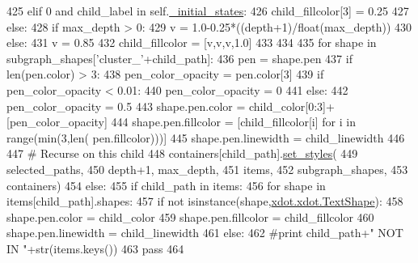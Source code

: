 \begin{DoxyCode}
425                         \textcolor{keywordflow}{elif} 0 \textcolor{keywordflow}{and} child\_label \textcolor{keywordflow}{in} self.\hyperlink{classsmacc__viewer_1_1ContainerNode_a3d5c9521ab4377e7b94e437d4f7e5a83}{\_initial\_states}:
426                             child\_fillcolor[3] = 0.25
427                         \textcolor{keywordflow}{else}:
428                             \textcolor{keywordflow}{if} max\_depth > 0:
429                                 v = 1.0-0.25*((depth+1)/float(max\_depth))
430                             \textcolor{keywordflow}{else}:
431                                 v = 0.85
432                             child\_fillcolor = [v,v,v,1.0]
433 
434                         
435                         \textcolor{keywordflow}{for} shape \textcolor{keywordflow}{in} subgraph\_shapes[\textcolor{stringliteral}{'cluster\_'}+child\_path]:
436                             pen = shape.pen
437                             \textcolor{keywordflow}{if} len(pen.color) > 3:
438                                 pen\_color\_opacity = pen.color[3]
439                                 \textcolor{keywordflow}{if} pen\_color\_opacity < 0.01:
440                                     pen\_color\_opacity = 0
441                             \textcolor{keywordflow}{else}:
442                                 pen\_color\_opacity = 0.5
443                             shape.pen.color = child\_color[0:3]+[pen\_color\_opacity]
444                             shape.pen.fillcolor = [child\_fillcolor[i] \textcolor{keywordflow}{for} i \textcolor{keywordflow}{in} range(min(3,len(
      pen.fillcolor)))]
445                             shape.pen.linewidth = child\_linewidth
446 
447                         \textcolor{comment}{# Recurse on this child}
448                         containers[child\_path].\hyperlink{classsmacc__viewer_1_1ContainerNode_ae35633b977b8ea568e70a62dcd3c4632}{set\_styles}(
449                                 selected\_paths,
450                                 depth+1, max\_depth,
451                                 items,
452                                 subgraph\_shapes,
453                                 containers)
454                 \textcolor{keywordflow}{else}:
455                     \textcolor{keywordflow}{if} child\_path \textcolor{keywordflow}{in} items:
456                         \textcolor{keywordflow}{for} shape \textcolor{keywordflow}{in} items[child\_path].shapes:
457                             \textcolor{keywordflow}{if} \textcolor{keywordflow}{not} isinstance(shape,\hyperlink{classsmacc__viewer_1_1xdot_1_1xdot_1_1TextShape}{xdot.xdot.TextShape}):
458                                 shape.pen.color = child\_color
459                                 shape.pen.fillcolor = child\_fillcolor
460                                 shape.pen.linewidth = child\_linewidth
461                     \textcolor{keywordflow}{else}:
462                         \textcolor{comment}{#print child\_path+" NOT IN "+str(items.keys())}
463                         \textcolor{keywordflow}{pass}
464 
\end{DoxyCode}


